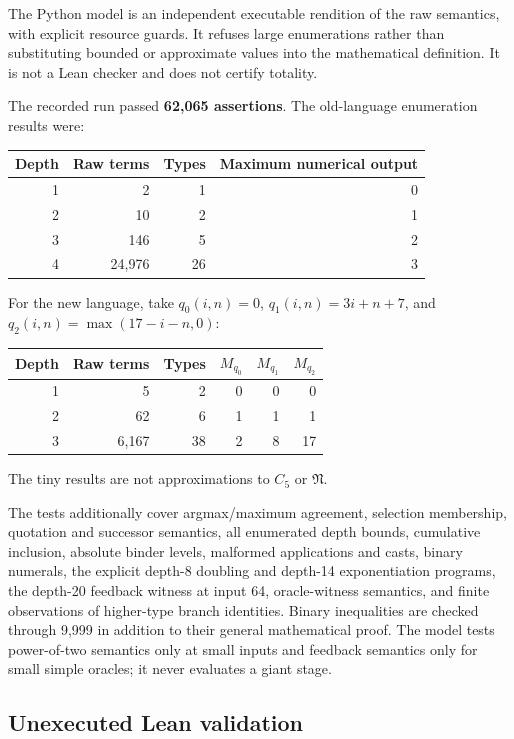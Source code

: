 \documentclass[11pt]{article}
\theoremstyle{definition}
\newcommand{\Entry}{\mathfrak N}
\newcommand{\Cfive}{C_5}
\begin{document}
The Python model is an independent executable rendition of the raw
semantics, with explicit resource guards. It refuses large enumerations
rather than substituting bounded or approximate values into the mathematical
definition. It is not a Lean checker and does not certify totality.

The recorded run passed \textbf{62,065 assertions}. The old-language
enumeration results were:
\begin{center}
\begin{tabular}{rrrr}
\toprule
Depth & Raw terms & Types & Maximum numerical output\\
\midrule
1 & 2 & 1 & 0\\
2 & 10 & 2 & 1\\
3 & 146 & 5 & 2\\
4 & 24,976 & 26 & 3\\
\bottomrule
\end{tabular}
\end{center}
For the new language, take $q_0(i,n)=0$,
$q_1(i,n)=3i+n+7$, and $q_2(i,n)=\max(17-i-n,0)$:
\begin{center}
\begin{tabular}{rrrrrr}
\toprule
Depth & Raw terms & Types & $M_{q_0}$ & $M_{q_1}$ & $M_{q_2}$\\
\midrule
1 & 5 & 2 & 0 & 0 & 0\\
2 & 62 & 6 & 1 & 1 & 1\\
3 & 6,167 & 38 & 2 & 8 & 17\\
\bottomrule
\end{tabular}
\end{center}
The tiny results are not approximations to $\Cfive$ or $\Entry$.

The tests additionally cover argmax/maximum agreement, selection membership,
quotation and successor semantics, all enumerated depth bounds, cumulative
inclusion, absolute binder levels, malformed applications and casts, binary
numerals, the explicit depth-8 doubling and depth-14 exponentiation programs,
the depth-20 feedback witness at input 64, oracle-witness semantics, and
finite observations of higher-type branch identities. Binary inequalities
are checked through 9,999 in addition to their general mathematical proof.
The model tests power-of-two semantics only at small inputs and feedback
semantics only for small simple oracles; it never evaluates a giant stage.

\subsection{Unexecuted Lean validation}
\end{document}
